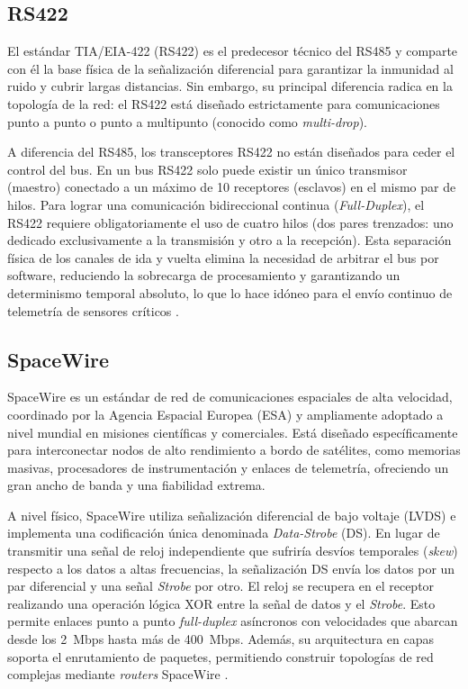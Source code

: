 \subsection{RS422}

El estándar TIA/EIA-422 (RS422) es el predecesor técnico del RS485 y comparte con él la
base física de la señalización diferencial para garantizar la inmunidad al ruido y cubrir largas
distancias. Sin embargo, su principal diferencia radica en la topología de la red: el RS422
está diseñado estrictamente para comunicaciones punto a punto o punto a multipunto
(conocido como \textit{multi-drop}).

A diferencia del RS485, los transceptores RS422 no están diseñados para ceder el control del
bus. En un bus RS422 solo puede existir un único transmisor (maestro) conectado a un
máximo de 10 receptores (esclavos) en el mismo par de hilos. Para lograr una comunicación
bidireccional continua (\textit{Full-Duplex}), el RS422 requiere obligatoriamente el uso de cuatro
hilos (dos pares trenzados: uno dedicado exclusivamente a la transmisión y otro a la
recepción). Esta separación física de los canales de ida y vuelta elimina la necesidad de
arbitrar el bus por software, reduciendo la sobrecarga de procesamiento y garantizando un
determinismo temporal absoluto, lo que lo hace idóneo para el envío continuo de telemetría
de sensores críticos \cite{ti2018rs422,tia422b}.

\subsection{SpaceWire}

SpaceWire es un estándar de red de comunicaciones espaciales de alta velocidad, coordinado
por la Agencia Espacial Europea (ESA) y ampliamente adoptado a nivel mundial en misiones
científicas y comerciales. Está diseñado específicamente para interconectar nodos de alto
rendimiento a bordo de satélites, como memorias masivas, procesadores de instrumentación
y enlaces de telemetría, ofreciendo un gran ancho de banda y una fiabilidad extrema.

A nivel físico, SpaceWire utiliza señalización diferencial de bajo voltaje (LVDS) e implementa
una codificación única denominada \textit{Data-Strobe} (DS). En lugar de transmitir una señal de
reloj independiente que sufriría desvíos temporales (\textit{skew}) respecto a los datos a altas
frecuencias, la señalización DS envía los datos por un par diferencial y una señal
\textit{Strobe} por otro. El reloj se recupera en el receptor realizando una operación lógica XOR
entre la señal de datos y el \textit{Strobe}. Esto permite enlaces punto a punto \textit{full-duplex}
asíncronos con velocidades que abarcan desde los 2~Mbps hasta más de 400~Mbps. Además,
su arquitectura en capas soporta el enrutamiento de paquetes, permitiendo construir
topologías de red complejas mediante \textit{routers} SpaceWire \cite{ecss50spw,parkes2012spw}.

